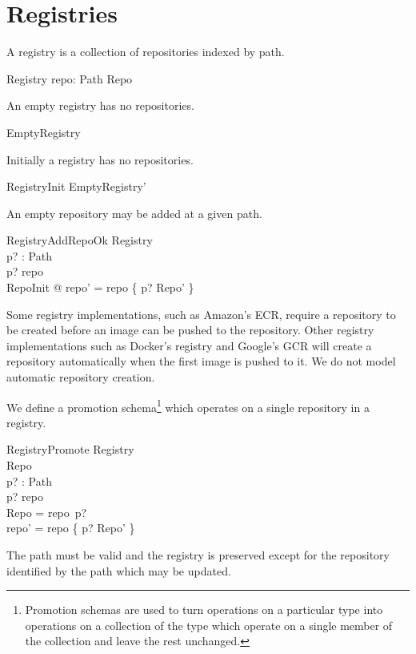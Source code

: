 \documentclass[a4paper,twoside,12pt]{article}
\begin{document}
\newpage
\section{Registries}

A registry is a collection of repositories indexed by path.
\begin{schema}{Registry}
    repo: Path \pfun Repo \\
\end{schema}

An empty registry has no repositories.
\begin{zed}
  EmptyRegistry 
\end{zed}

Initially a registry has no repositories.
\begin{zed}
  RegistryInit  EmptyRegistry'
\end{zed}

An empty repository may be added at a given path.
\begin{schema}{RegistryAddRepoOk}
  \Delta Registry \\
  p? : Path \\
\where
  p? \notin \dom repo \\
  \exists RepoInit @ repo' = repo \cup \{ p? \mapsto \theta Repo' \}
\end{schema}
Some registry implementations, such as Amazon's ECR, require a repository to be created before an image can be pushed to the repository.
Other registry implementations such as Docker's registry and Google's GCR will create a repository automatically when the first image is pushed to it. We do not model automatic repository creation.

\pagebreak
We define a promotion schema\footnote{Promotion schemas are used to turn operations on a particular type into operations on a collection of the type which operate on a single member of the collection and leave the rest unchanged.} which operates on a single repository in a registry.
\begin{schema}{RegistryPromote}
  \Delta Registry \\
  \Delta Repo \\
  p? : Path \\
\where
  p? \in \dom repo \\
  \theta Repo = repo~p? \\
  repo' = repo \oplus \{ p? \mapsto \theta Repo' \} \\
\end{schema}
The path must be valid and the registry is preserved except for the repository identified by the path which may be updated.
\end{document}
